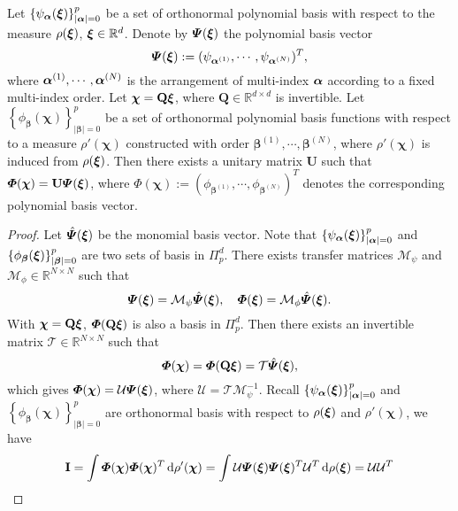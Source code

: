 \begin{thm}
  Let $\left\{\psi_{\bm\alpha}(\bm\xi)\right\}_{\vert \bm\alpha \vert = 0}^{p}$ be a set of orthonormal polynomial basis  with respect to the measure $\rho(\bm\xi)$, $\bm\xi \in \mathbb{R}^d$.
  Denote by $\bm{\varPsi}(\bm\xi)$ the polynomial basis vector
  \begin{equation}
    \bm{\varPsi}(\bm\xi) := (\psi_{\bm\alpha^{(1)}}, \cdots, \psi_{\bm\alpha^{(N)}})^T,
    \label{eq:poly_basis_vector}
  \end{equation}
  where $\bm\alpha^{(1)}, \cdots, \bm\alpha^{(N)}$ is the arrangement of multi-index $\bm\alpha$ according to a fixed multi-index order.
  Let $\bm\chi = \mathbf{Q}\bm\xi$, where $\mathbf{Q}\in \mathbb{R}^{d\times d}$ is invertible. Let  $\left\{\phi_{\bm\beta}(\bm\chi)\right\}_{\vert \bm\beta \vert = 0}^{p}$ be a set of orthonormal polynomial basis functions with respect to a measure $\rho'(\bm\chi)$ constructed with order $\bm\beta^{(1)},\cdots,\bm\beta^{(N)}$, where $\rho'(\bm \chi)$ is induced from $\rho(\bm\xi)$.
  Then there exists a unitary matrix $\mathbf{U}$ such that $\bm{\varPhi}(\bm\chi) = \mathbf{U}  \bm{\varPsi}(\bm\xi)$, where $\bm{\varPhi}(\bm\chi):=(\phi_{\bm\beta^{(1)}}, \cdots, \phi_{\bm\beta^{(N)}})^T$ denotes the corresponding polynomial basis vector.
  \label{thm:orth_basis}
\end{thm}
\begin{proof}
  Let $\hat{\bm{\varPsi}}(\bm\xi)$ be the monomial basis vector.
  Note that $\left\{\psi_{\bm\alpha}(\bm\xi)\right\}_{\vert \bm\alpha \vert = 0}^{p}$ and $\left\{\phi_{\bm\beta}(\bm{\bm\xi})\right\}_{\vert \bm\beta \vert = 0}^{p}$  are two sets of basis in $\Pi_{p}^d$.
  There exists transfer matrices $\mathcal{M_{\psi}}$ and $\mathcal{M_{\phi}}\in \mathbb{R}^{N\times N}$ such that
  \begin{equation}
    \bm{\varPsi}(\bm\xi)= \mathcal{M}_{\psi} \hat{\bm{\varPsi}}(\bm\xi), \quad \bm{\varPhi}(\bm\xi)= \mathcal{M}_{\phi} \hat{\bm{\varPsi}}(\bm\xi). \nonumber
  \end{equation}
  With $\bm\chi = \mathbf{Q}\bm\xi$, $\bm\varPhi(\mathbf{Q}\bm\xi)$ is also a basis in $\Pi_p^d$.
  Then there exists an invertible matrix $\mathcal{T}\in\mathbb{R}^{N\times N}$ such that
  \begin{equation}
    \bm{\varPhi}(\bm\chi) = \bm{\varPhi}(\mathbf{Q}\bm\xi)= \mathcal{T} \hat{\bm{\varPsi}}(\bm\xi) \nonumber,
  \end{equation}
  which gives $\bm{\varPhi}(\bm\chi) = \mathcal{U} \bm{\varPsi}(\bm\xi)$, where $\mathcal{U} = \mathcal{T} \mathcal{M}_{\psi}^{-1}$.
  Recall $\left\{\psi_{\bm\alpha}(\bm\xi)\right\}_{\vert \bm\alpha \vert = 0}^{p}$ and $\left\{\phi_{\bm\beta}(\bm\chi)\right\}_{\vert \bm\beta \vert = 0}^{p}$ are orthonormal basis with respect to $\rho(\bm\xi)$ and $\rho'(\bm\chi)$, we have
  \begin{equation}
    \mathbf{I} = \int \bm{\varPhi}(\bm\chi) \bm{\varPhi}(\bm\chi)^T \,\mathrm{d} \rho'(\bm\chi) = \int \mathcal{U}\bm{\varPsi}(\bm\xi) \bm{\varPsi}(\bm\xi)^T  \mathcal{U}^T  \,\mathrm{d} \rho(\bm\xi) = \mathcal{U} \mathcal{U}^T
  \end{equation}
\end{proof}
